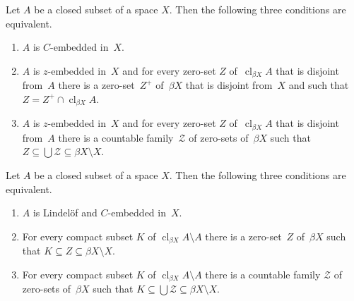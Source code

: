 \documentclass[10pt,a4paper]{amsart}
\newcommand\calZ{\mathcal{Z}}
\newcommand\clbeta[1][X]{\cl_{\beta #1}}
\newcommand\cl{\operatorname{cl}}
\begin{document}
\begin{lemma}\label{lemma.1st}
Let $A$ be a closed subset of a space $X$.
Then the following three conditions are equivalent.
\begin{enumerate}
\item $A$ is $C$-embedded in~$X$.
\item $A$ is $z$-embedded in~$X$ and for every zero-set $Z$ of~$\clbeta A$ 
      that is disjoint from~$A$ there is a zero-set~$Z^+$ of~$\beta X$ that 
      is disjoint from~$X$ and such that $Z=Z^+\cap\clbeta A$.
\item $A$ is $z$-embedded in~$X$ and for every zero-set $Z$ of~$\clbeta A$ 
      that is disjoint from~$A$ there is a countable family~$\calZ$ of 
      zero-sets of~$\beta X$ such that 
      $Z\subseteq\bigcup\calZ\subseteq\beta X\setminus X$.
\end{enumerate}
\end{lemma}

\begin{theorem}\label{thm.first}
Let $A$ be a closed subset of a space $X$.
Then the following three conditions are equivalent.
\begin{enumerate}
\item $A$ is Lindel\"of and $C$-embedded in~$X$.
\item For every compact subset $K$ of $\clbeta A\setminus A$ there is a 
      zero-set~$Z$ of~$\beta X$ such that 
      $K\subseteq Z\subseteq\beta X\setminus X$.
\item For every compact subset $K$ of $\clbeta A\setminus A$ there is a 
      countable family $\calZ$ of zero-sets of~$\beta X$ such that 
      $K\subseteq\bigcup\calZ\subseteq\beta X\setminus X$.
\end{enumerate}
\end{theorem}
\end{document}
